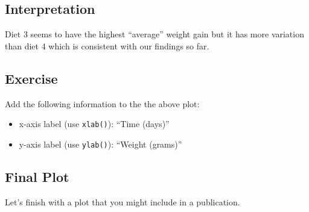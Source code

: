 \documentclass[letterpaperpaper,9pt,twocolumn,twoside,printwatermark=false]{pinp}
\providecommand{\tightlist}{%
  \setlength{\itemsep}{0pt}\setlength{\parskip}{0pt}}
\begin{document}
\hypertarget{interpretation-4}{%
\subsection{Interpretation}\label{interpretation-4}}

Diet 3 seems to have the highest ``average'' weight gain but it has more
variation than diet 4 which is consistent with our findings so far.

\hypertarget{exercise-8}{%
\subsection{Exercise}\label{exercise-8}}

Add the following information to the the above plot:

\begin{itemize}
\tightlist
\item
  x-axis label (use \texttt{xlab()}): ``Time (days)''
\item
  y-axis label (use \texttt{ylab()}): ``Weight (grams)''
\end{itemize}

\hypertarget{final-plot}{%
\subsection{Final Plot}\label{final-plot}}

Let's finish with a plot that you might include in a publication.

\begin{Shaded}
\begin{Highlighting}[]
                             \OperatorTok{+}
\StringTok{  }\NormalTok{(}\OperatorTok{~}\StringTok{ }\OperatorTok{+}
\StringTok{  }\NormalTok{() }\OperatorTok{+}
\StringTok{  }\NormalTok{(}\NormalTok{, }\NormalTok{,}
               \NormalTok{) }\OperatorTok{+}
\StringTok{  }\NormalTok{(} \NormalTok{) }\OperatorTok{+}
\StringTok{  }\NormalTok{(}\NormalTok{) }\OperatorTok{+}\StringTok{ }
\StringTok{  }\NormalTok{(}\NormalTok{) }\OperatorTok{+}
\StringTok{  }\NormalTok{(}\NormalTok{)}
\end{Highlighting}
\end{Shaded}
\end{document}
